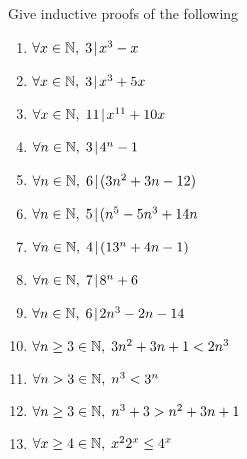 
Give inductive proofs of the following 
\begin{enumerate}
\item $\forall x \in {\mathbb N}, \; 3 \!\mid\! x^3-x$

\item $\forall x \in {\mathbb N}, \; 3 \!\mid\! x^3+5x$

\item $\forall x \in {\mathbb N}, \; 11 \!\mid\! x^{11}+10x$

\item $\forall n \in {\mathbb N}, \; 3 \!\mid\! 4^n-1$

\item $\forall n \in {\mathbb N}, \; 6 \!\mid\! (3n^{2}+3n-12)$

\item $\forall n \in {\mathbb N}, \; 5 \!\mid\! (n^{5}-5n^{3}+14n$

\item $\forall n \in {\mathbb N}, \; 4 \!\mid\! (13^{n}+4n-1)$

\item $\forall n \in {\mathbb N}, \; 7 \!\mid\! 8^n+6$

\item $\forall n \in {\mathbb N}, \; 6 \!\mid\! 2n^3 - 2n - 14$

\item $\forall n \geq 3 \in {\mathbb N}, \; 3n^2+3n+1 < 2n^3$

\item $\forall n > 3 \in {\mathbb N}, \; n^3 < 3^n$

\item $\forall n \geq 3 \in {\mathbb N}, \; n^{3}+3>n^{2}+3n+1$

\item $\forall x \geq 4 \in {\mathbb N}, \; x^22^x \leq 4^x$
\end{enumerate}



